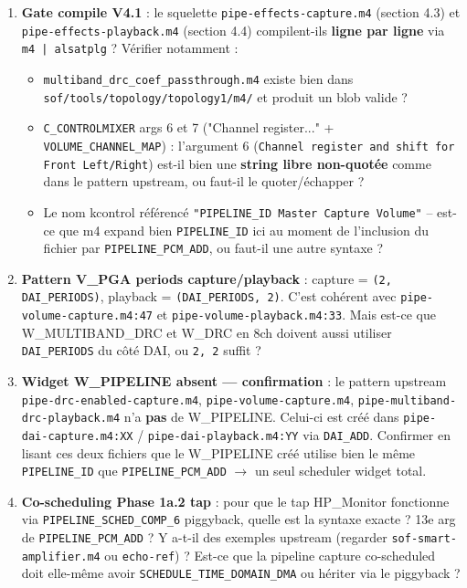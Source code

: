 \documentclass[11pt,a4paper]{article}
\begin{document}
\begin{enumerate}[leftmargin=*, itemsep=2pt]
  \item \textbf{Gate compile V4.1} : le squelette \texttt{pipe-effects-capture.m4} (section 4.3) et \texttt{pipe-effects-playback.m4} (section 4.4) compilent-ils \textbf{ligne par ligne} via \texttt{m4 | alsatplg} ? Vérifier notamment :
    \begin{itemize}[leftmargin=*]
      \item \texttt{multiband\_drc\_coef\_passthrough.m4} existe bien dans \texttt{sof/tools/topology/topology1/m4/} et produit un blob valide ?
      \item \texttt{C\_CONTROLMIXER} args 6 et 7 ("Channel register..." + \texttt{VOLUME\_CHANNEL\_MAP}) : l'argument 6 (\texttt{Channel register and shift for Front Left/Right}) est-il bien une \textbf{string libre non-quotée} comme dans le pattern upstream, ou faut-il le quoter/échapper ?
      \item Le nom kcontrol référencé \texttt{"PIPELINE\_ID Master Capture Volume"} -- est-ce que m4 expand bien \texttt{PIPELINE\_ID} ici au moment de l'inclusion du fichier par \texttt{PIPELINE\_PCM\_ADD}, ou faut-il une autre syntaxe ?
    \end{itemize}
  \item \textbf{Pattern V\_PGA periods capture/playback} : capture = \texttt{(2, DAI\_PERIODS)}, playback = \texttt{(DAI\_PERIODS, 2)}. C'est cohérent avec \texttt{pipe-volume-capture.m4:47} et \texttt{pipe-volume-playback.m4:33}. Mais est-ce que W\_MULTIBAND\_DRC et W\_DRC en 8ch doivent aussi utiliser \texttt{DAI\_PERIODS} du côté DAI, ou \texttt{2, 2} suffit ?
  \item \textbf{Widget W\_PIPELINE absent --- confirmation} : le pattern upstream \texttt{pipe-drc-enabled-capture.m4}, \texttt{pipe-volume-capture.m4}, \texttt{pipe-multiband-drc-playback.m4} n'a \textbf{pas} de W\_PIPELINE. Celui-ci est créé dans \texttt{pipe-dai-capture.m4:XX} / \texttt{pipe-dai-playback.m4:YY} via \texttt{DAI\_ADD}. Confirmer en lisant ces deux fichiers que le W\_PIPELINE créé utilise bien le même \texttt{PIPELINE\_ID} que \texttt{PIPELINE\_PCM\_ADD} $\to$ un seul scheduler widget total.
  \item \textbf{Co-scheduling Phase 1a.2 tap} : pour que le tap HP\_Monitor fonctionne via \texttt{PIPELINE\_SCHED\_COMP\_6} piggyback, quelle est la syntaxe exacte ? 13e arg de \texttt{PIPELINE\_PCM\_ADD} ? Y a-t-il des exemples upstream (regarder \texttt{sof-smart-amplifier.m4} ou \texttt{echo-ref}) ? Est-ce que la pipeline capture co-scheduled doit elle-même avoir \texttt{SCHEDULE\_TIME\_DOMAIN\_DMA} ou hériter via le piggyback ?

\end{enumerate}
\end{document}
